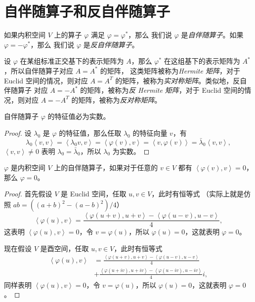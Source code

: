 \documentclass[fontset=none,zihao=-4]{Notes}
\newcommand{\inn}[1]{\left\langle#1\right\rangle}
\begin{document}
\section{自伴随算子和反自伴随算子}

如果内积空间 $V$ 上的算子 $\varphi$ 满足 $\varphi=\varphi^*$，那么
我们说 $\varphi$ 是\emph{自伴随算子}。如果 $\varphi=-\varphi^*$，那么
我们说 $\varphi$ 是\emph{反自伴随算子}。

设 $\varphi$ 在某组标准正交基下的表示矩阵为 $A$，那么 $\varphi^*$
在这组基下的表示矩阵为 $A^*$，所以自伴随算子对应 $A=A^*$ 的矩阵，
这类矩阵被称为\emph{Hermite 矩阵}，对于 Euclid 空间的情况，则对应
$A=A^T$ 的矩阵，被称为\emph{实对称矩阵}。类似地，反自伴随算子
对应 $A=-A^*$ 的矩阵，被称为\emph{反 Hermite 矩阵}，对于 Euclid 空间的情况，则对应
$A=-A^T$ 的矩阵，被称为\emph{反对称矩阵}。

\begin{theorem}\label{thm:eigenvalue of self-adjoint operator}
  自伴随算子 $\varphi$ 的特征值必为实数。
\end{theorem}
\begin{proof}
  设 $\lambda_0$ 是 $\varphi$ 的特征值，那么任取 $\lambda_0$ 的特征向量 $v$，有
  \[
    \lambda_0\inn{v,v}=\inn{\lambda_0v,v}=\inn{\varphi(v),v}  =
    \inn{v,\varphi(v)}=\bar\lambda_0\inn{v,v},
  \]
  $\inn{v,v}\neq 0$ 表明 $\lambda_0=\bar\lambda_0$，所以 $\lambda_0$ 为实数。
\end{proof}

\begin{theorem}\label{thm:property of self-adjoint operator}
  $\varphi$ 是内积空间 $V$ 上的自伴随算子，如果对于任意的 $v\in V$
  都有 $\inn{\varphi(v),v}=0$，那么 $\varphi=0$。
\end{theorem}
\begin{proof}
  首先假设 $V$ 是 Euclid 空间，任取 $u,v\in V$，此时有恒等式
  （实际上就是仿照 $ab=\left((a+b)^2-(a-b)^2\right)/4$）
  \[
    \inn{\varphi(u),v}=\frac{\inn{\varphi(u+v),u+v}-\inn{\varphi(u-v),u-v}}{4},  
  \]
  这表明 $\inn{\varphi(u),v}=0$，令 $v=\varphi(u)$，所以 
  $\varphi(u)=0$，这就表明 $\varphi=0$。

  现在假设 $V$ 是酉空间，任取 $u,v\in V$，此时有恒等式
  \begin{align*}
    \inn{\varphi(u),v}&=\frac{\inn{\varphi(u+v),u+v}-\inn{\varphi(u-v),u-v}}{4}\\
    &+\frac{\inn{\varphi(u+iv),u+iv}-\inn{\varphi(u-iv),u-iv}}{4}i,
  \end{align*}
  同样表明 $\inn{\varphi(u),v}=0$，令 $v=\varphi(u)$，所以 
  $\varphi(u)=0$，这就表明 $\varphi=0$。
\end{proof}
\end{document}
